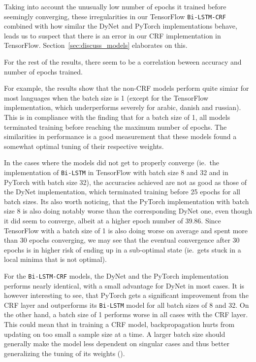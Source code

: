 Taking into account the unusually low number of epochs it trained before
seemingly converging, these irregularities in our TensorFlow
\texttt{Bi-LSTM-CRF} combined with how similar the DyNet and PyTorch
implementations behave, leads us to suspect that there is an error in our CRF
implementation in TensorFlow. Section~\ref{sec:discuss_models} elaborates on this.

For the rest of the results, there seem to be a correlation beween accuracy and
number of epochs trained.

For example, the results show that the non-CRF models perform quite simiar for
most languages when the batch size is 1 (except for the TensorFlow
implementation, which underperforms severely for arabic, danish and russian).
This is in compliance with the finding that for a batch size of 1, all models
terminated training before reaching the maximum number of epochs. The
similarities in performance is a good measurement that these models found a
somewhat optimal tuning of their respective weights.

In the cases where the models did not get to properly converge (ie.\ the
implementation of \texttt{Bi-LSTM} in TensorFlow with batch size 8 and 32 and in
PyTorch with batch size 32), the accuracies achieved are not as good as those of
the DyNet implementation, which terminated training before 25 epochs for
all batch sizes. Its also worth noticing, that the PyTorch implementation with
batch size 8 is also doing notably worse than the corresponding DyNet one, even
though it did seem to converge, albeit at a higher epoch number of 39.86. Since
TensorFlow with a batch size of 1 is also doing worse on average and spent more
than 30 epochs converging, we may see that the eventual convergence after 30
epochs is in higher risk of ending up in a sub-optimal state (ie.\ gets stuck in
a local minima that is not optimal).

For the \texttt{Bi-LSTM-CRF} models, the DyNet and the PyTorch implementation
performs nearly identical, with a small advantage for DyNet in most cases. It is
however interesting to see, that PyTorch gets a significant improvement from the
CRF layer and outperforms its \texttt{Bi-LSTM} model for all batch sizes of 8
and 32. On the other hand, a batch size of 1 performs worse in all cases with
the CRF layer. This could mean that in training a CRF model, backpropagation
hurts from updating on too small a sample size at a time. A larger batch size
should generally make the model less dependent on singular cases and thus better
generalizing the tuning of its weights (\cite{falcon2018lstms}).

